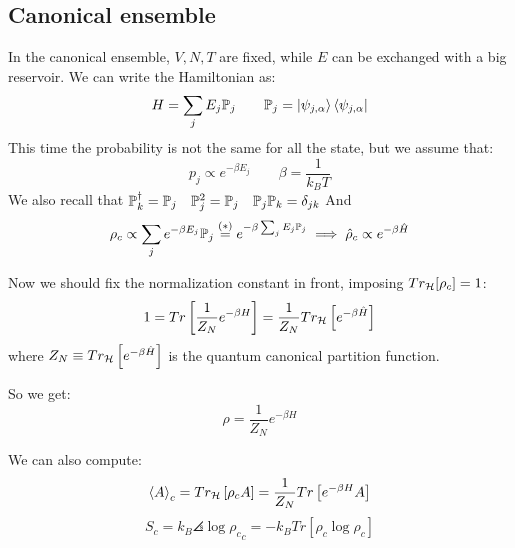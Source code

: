 \subsection{Canonical ensemble}
In the canonical ensemble, $V,N,T$ are fixed, while $E$ can be exchanged with a big reservoir. We can write the Hamiltonian as:
$$H = \sum_j E_j \mathbb{P}_j \qquad \mathbb{P}_j = \left|\psi_{j,\alpha}\right\rangle\left\langle\psi_{j,\alpha}\right|$$ 
This time the probability is not the same for all the state, but we assume that:
$$ p_j \propto e^{-\beta E_j} \qquad \beta = \frac 1{k_BT}$$
We also recall that $\mathbb{P}_k^\dag = \mathbb{P}_j \quad \mathbb{P}_j^2 = \mathbb{P}_j\quad \mathbb{P}_j\mathbb{P}_k = \delta_{jk}$
And
$$ \rho_c \propto \sum_j e^{-\beta E_j} \mathbb{P}_j \stackrel{(*)}= e^{-\beta \sum_j E_j \mathbb{P}_j} \implies \hat \rho_c \propto e^{-\beta \hat H}$$

Now we should fix the normalization constant in front, imposing $Tr_{\mathcal{H}}[\rho_c]= 1$:
$$1 = Tr\left[\frac 1{Z_N}e^{-\beta H}\right] = \frac 1{Z_N} Tr_{\mathcal{H}}\left[e^{-\beta \hat H}\right]$$
where $Z_N \equiv Tr_{\mathcal{H}} \left[e^{-\beta\hat H}\right]$ is the quantum canonical partition function.

So we get: $$\rho = \frac 1{Z_N} e^{-\beta H}$$

We can also compute:
$$ \left<A\right>_c = Tr_{\mathcal{H}}\left[\rho_cA\right] = \frac 1{Z_N} Tr\left[e^{-\beta H}A\right]$$
$$S_c = k_B\angles{\log \rho_c}_c = -k_B Tr\left[\rho_c \log \rho_c\right]$$

